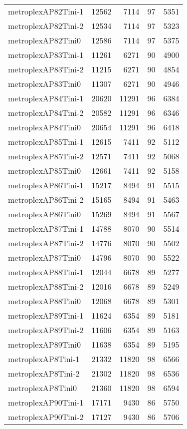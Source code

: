 \begin{longtable}{lrrrr}
metroplexAP82Tini-1 & 12562 & 7114 & 97 & 5351 \\
metroplexAP82Tini-2 & 12534 & 7114 & 97 & 5323 \\
metroplexAP82Tini0 & 12586 & 7114 & 97 & 5375 \\
metroplexAP83Tini-1 & 11261 & 6271 & 90 & 4900 \\
metroplexAP83Tini-2 & 11215 & 6271 & 90 & 4854 \\
metroplexAP83Tini0 & 11307 & 6271 & 90 & 4946 \\
metroplexAP84Tini-1 & 20620 & 11291 & 96 & 6384 \\
metroplexAP84Tini-2 & 20582 & 11291 & 96 & 6346 \\
metroplexAP84Tini0 & 20654 & 11291 & 96 & 6418 \\
metroplexAP85Tini-1 & 12615 & 7411 & 92 & 5112 \\
metroplexAP85Tini-2 & 12571 & 7411 & 92 & 5068 \\
metroplexAP85Tini0 & 12661 & 7411 & 92 & 5158 \\
metroplexAP86Tini-1 & 15217 & 8494 & 91 & 5515 \\
metroplexAP86Tini-2 & 15165 & 8494 & 91 & 5463 \\
metroplexAP86Tini0 & 15269 & 8494 & 91 & 5567 \\
metroplexAP87Tini-1 & 14788 & 8070 & 90 & 5514 \\
metroplexAP87Tini-2 & 14776 & 8070 & 90 & 5502 \\
metroplexAP87Tini0 & 14796 & 8070 & 90 & 5522 \\
metroplexAP88Tini-1 & 12044 & 6678 & 89 & 5277 \\
metroplexAP88Tini-2 & 12016 & 6678 & 89 & 5249 \\
metroplexAP88Tini0 & 12068 & 6678 & 89 & 5301 \\
metroplexAP89Tini-1 & 11624 & 6354 & 89 & 5181 \\
metroplexAP89Tini-2 & 11606 & 6354 & 89 & 5163 \\
metroplexAP89Tini0 & 11638 & 6354 & 89 & 5195 \\
metroplexAP8Tini-1 & 21332 & 11820 & 98 & 6566 \\
metroplexAP8Tini-2 & 21302 & 11820 & 98 & 6536 \\
metroplexAP8Tini0 & 21360 & 11820 & 98 & 6594 \\
metroplexAP90Tini-1 & 17171 & 9430 & 86 & 5750 \\
metroplexAP90Tini-2 & 17127 & 9430 & 86 & 5706 \\

\end{longtable}

